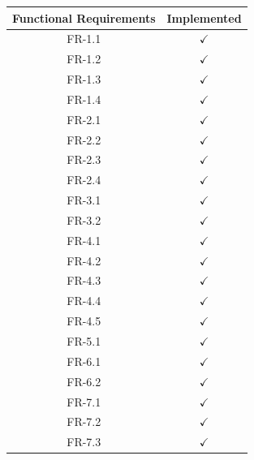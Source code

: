 \documentclass{article}
\begin{document}
\begin{table}[ht]
    \centering
    \begin{tabular}{@{}ll@{}}
        \toprule
        \textbf{Functional Requirements} & \textbf{Implemented} \\ \midrule
        \multicolumn{1}{c}{FR-1.1} & \multicolumn{1}{c}{$\checkmark$} \\ 
        \multicolumn{1}{c}{FR-1.2} & \multicolumn{1}{c}{$\checkmark$} \\ 
        \multicolumn{1}{c}{FR-1.3} & \multicolumn{1}{c}{$\checkmark$} \\ 
        \multicolumn{1}{c}{FR-1.4} & \multicolumn{1}{c}{$\checkmark$} \\ 
        \multicolumn{1}{c}{FR-2.1} & \multicolumn{1}{c}{$\checkmark$} \\ 
        \multicolumn{1}{c}{FR-2.2} & \multicolumn{1}{c}{$\checkmark$} \\ 
        \multicolumn{1}{c}{FR-2.3} & \multicolumn{1}{c}{$\checkmark$} \\ 
        \multicolumn{1}{c}{FR-2.4} & \multicolumn{1}{c}{$\checkmark$} \\ 
        \multicolumn{1}{c}{FR-3.1} & \multicolumn{1}{c}{$\checkmark$} \\ 
        \multicolumn{1}{c}{FR-3.2} & \multicolumn{1}{c}{$\checkmark$} \\ 
        \multicolumn{1}{c}{FR-4.1} & \multicolumn{1}{c}{$\checkmark$} \\ 
        \multicolumn{1}{c}{FR-4.2} & \multicolumn{1}{c}{$\checkmark$} \\ 
        \multicolumn{1}{c}{FR-4.3} & \multicolumn{1}{c}{$\checkmark$} \\ 
        \multicolumn{1}{c}{FR-4.4} & \multicolumn{1}{c}{$\checkmark$} \\ 
        \multicolumn{1}{c}{FR-4.5} & \multicolumn{1}{c}{$\checkmark$} \\ 
        \multicolumn{1}{c}{FR-5.1} & \multicolumn{1}{c}{$\checkmark$} \\ 
        \multicolumn{1}{c}{FR-6.1} & \multicolumn{1}{c}{$\checkmark$} \\ 
        \multicolumn{1}{c}{FR-6.2} & \multicolumn{1}{c}{$\checkmark$} \\ 
        \multicolumn{1}{c}{FR-7.1} & \multicolumn{1}{c}{$\checkmark$} \\ 
        \multicolumn{1}{c}{FR-7.2} & \multicolumn{1}{c}{$\checkmark$} \\ 
        \multicolumn{1}{c}{FR-7.3} & \multicolumn{1}{c}{$\checkmark$} \\ 

\end{tabular}
\end{table}
\end{document}
